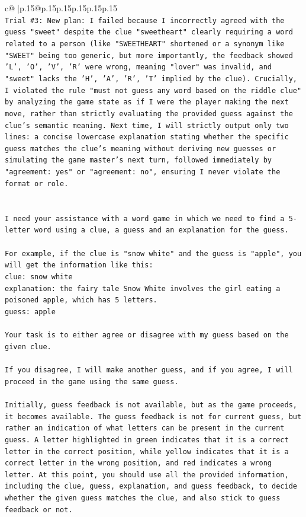 \documentclass{article}
\begin{document}
{\begin{supertabular}{c@{$\;$}|p{.15\linewidth}@{}p{.15\linewidth}p{.15\linewidth}p{.15\linewidth}p{.15\linewidth}p{.15\linewidth}}
{{{\\ 
\texttt{Trial \#3: New plan: I failed because I incorrectly agreed with the guess "sweet" despite the clue "sweetheart" clearly requiring a word related to a person (like "SWEETHEART" shortened or a synonym like "SWEET" being too generic, but more importantly, the feedback showed 'L', 'O', 'V', 'R' were wrong, meaning "lover" was invalid, and "sweet" lacks the 'H', 'A', 'R', 'T' implied by the clue). Crucially, I violated the rule "must not guess any word based on the riddle clue" by analyzing the game state as if I were the player making the next move, rather than strictly evaluating the provided guess against the clue's semantic meaning. Next time, I will strictly output only two lines: a concise lowercase explanation stating whether the specific guess matches the clue's meaning without deriving new guesses or simulating the game master's next turn, followed immediately by "agreement: yes" or "agreement: no", ensuring I never violate the format or role.} \\
\\ 
\\ 
\texttt{I need your assistance with a word game in which we need to find a 5{-}letter word using a clue, a guess and an explanation for the guess.} \\
\\ 
\texttt{For example, if the clue is "snow white" and the guess is "apple", you will get the information like this:} \\
\texttt{clue: snow white} \\
\texttt{explanation: the fairy tale Snow White involves the girl eating a poisoned apple, which has 5 letters.} \\
\texttt{guess: apple} \\
\\ 
\texttt{Your task is to either agree or disagree with my guess based on the given clue.} \\
\\ 
\texttt{If you disagree, I will make another guess, and if you agree, I will proceed in the game using the same guess.} \\
\\ 
\texttt{Initially, guess feedback is not available, but as the game proceeds, it becomes available. The guess feedback is not for current guess, but rather an indication of what letters can be present in the current guess. A letter highlighted in green indicates that it is a correct letter in the correct position, while yellow indicates that it is a correct letter in the wrong position, and red indicates a wrong letter. At this point, you should use all the provided information, including the clue, guess, explanation, and guess feedback, to decide whether the given guess matches the clue, and also stick to guess feedback or not.} \\
}}}
\end{supertabular}}
\end{document}
